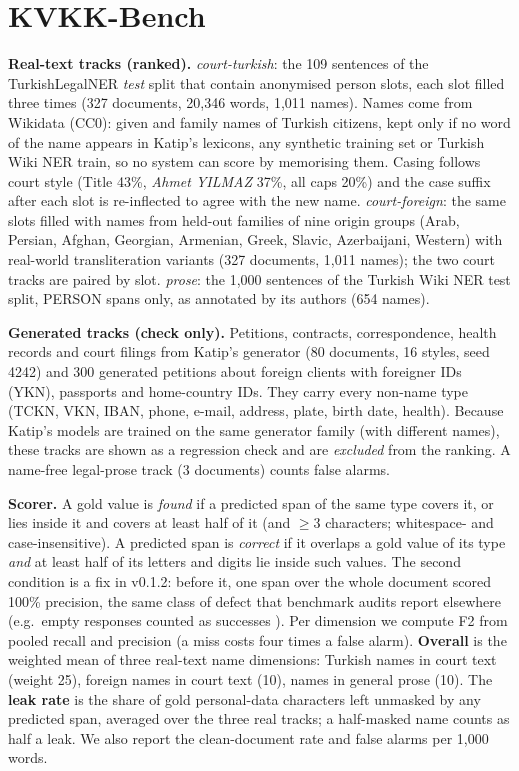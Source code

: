 \documentclass[10pt,twocolumn]{article}
\begin{document}
\section{KVKK-Bench}
\label{sec:bench}

\textbf{Real-text tracks (ranked).} \emph{court-turkish}: the 109 sentences of the TurkishLegalNER \emph{test}
split \citep{cetindag2022tlner} that contain anonymised person slots, each slot filled three times (327 documents,
20,346 words, 1,011 names). Names come from Wikidata (CC0): given and family names of Turkish citizens, kept only if
no word of the name appears in Katip's lexicons, any synthetic training set or Turkish Wiki NER train, so no
system can score by memorising them. Casing follows court style (Title 43\%, \emph{Ahmet YILMAZ} 37\%, all caps
20\%) and the case suffix after each slot is re-inflected to agree with the new name. \emph{court-foreign}: the
same slots filled with names from held-out families of nine origin groups (Arab, Persian, Afghan, Georgian,
Armenian, Greek, Slavic, Azerbaijani, Western) with real-world transliteration variants (327 documents, 1,011
names); the two court tracks are paired by slot. \emph{prose}: the 1,000 sentences of the Turkish Wiki NER test
split, PERSON spans only, as annotated by its authors \citep{altinok2023} (654 names).

\textbf{Generated tracks (check only).} Petitions, contracts, correspondence, health records and court filings
from Katip's generator (80 documents, 16 styles, seed 4242) and 300 generated petitions about foreign clients with
foreigner IDs (YKN), passports and home-country IDs. They carry every non-name type (TCKN, VKN, IBAN, phone,
e-mail, address, plate, birth date, health). Because Katip's models are trained on the same generator family
(with different names), these tracks are shown as a regression check and are \emph{excluded} from the ranking.
A name-free legal-prose track (3 documents) counts false alarms.

\textbf{Scorer.} A gold value is \emph{found} if a predicted span of the same type covers it, or lies inside it
and covers at least half of it (and $\geq$3 characters; whitespace- and case-insensitive). A predicted span is
\emph{correct} if it overlaps a gold value of its type \emph{and} at least half of its letters and digits lie
inside such values. The second condition is a fix in v0.1.2: before it, one span over the whole document scored
100\% precision, the same class of defect that benchmark audits report elsewhere (e.g.\ empty responses counted
as successes \citep{zhu2025abc}). Per dimension we compute F2 \citep{vanrijsbergen1979} from pooled recall and precision (a miss
costs four times a false alarm). \textbf{Overall} is the weighted mean of three real-text name dimensions:
Turkish names in court text (weight 25), foreign names in court text (10), names in general prose (10). The
\textbf{leak rate} is the share of gold personal-data characters left unmasked by any predicted span, averaged
over the three real tracks; a half-masked name counts as half a leak. We also report the clean-document rate and
false alarms per 1,000 words.
\end{document}
